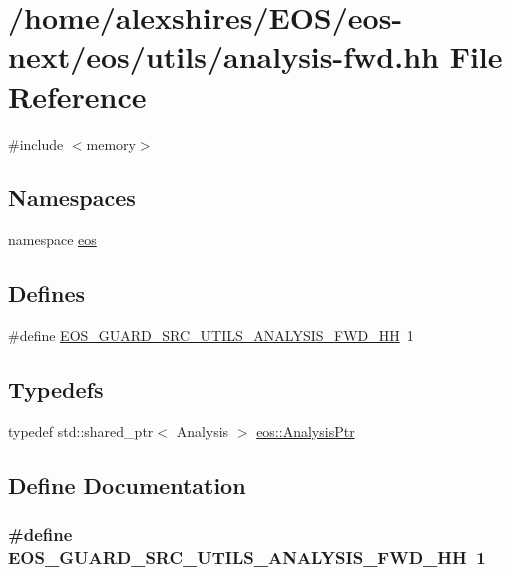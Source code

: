 \hypertarget{analysis-fwd_8hh}{
\section{/home/alexshires/EOS/eos-\/next/eos/utils/analysis-\/fwd.hh File Reference}
\label{analysis-fwd_8hh}
}
{\ttfamily \#include $<$memory$>$}\par
\subsection*{Namespaces}
\begin{DoxyCompactItemize}
\item 
namespace \hyperlink{namespaceeos}{eos}
\end{DoxyCompactItemize}
\subsection*{Defines}
\begin{DoxyCompactItemize}
\item 
\#define \hyperlink{analysis-fwd_8hh_a897924e14cc000a079309088de1e0163}{EOS\_\-GUARD\_\-SRC\_\-UTILS\_\-ANALYSIS\_\-FWD\_\-HH}~1
\end{DoxyCompactItemize}
\subsection*{Typedefs}
\begin{DoxyCompactItemize}
\item 
typedef std::shared\_\-ptr$<$ Analysis $>$ \hyperlink{namespaceeos_afc57020492535ccdd85cfc3b7421340d}{eos::AnalysisPtr}
\end{DoxyCompactItemize}


\subsection{Define Documentation}
\hypertarget{analysis-fwd_8hh_a897924e14cc000a079309088de1e0163}{
\subsubsection[{EOS\_\-GUARD\_\-SRC\_\-UTILS\_\-ANALYSIS\_\-FWD\_\-HH}]{\setlength{\rightskip}{0pt plus 5cm}\#define EOS\_\-GUARD\_\-SRC\_\-UTILS\_\-ANALYSIS\_\-FWD\_\-HH~1}}
\label{analysis-fwd_8hh_a897924e14cc000a079309088de1e0163}
